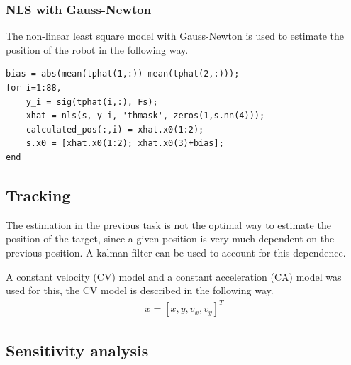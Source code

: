 \documentclass[11pt]{article}
\begin{document}
\subsubsection{NLS with Gauss-Newton}
The non-linear least square model with Gauss-Newton is used to estimate the position of the robot in the following way.

\begin{verbatim}
bias = abs(mean(tphat(1,:))-mean(tphat(2,:)));
for i=1:88,
    y_i = sig(tphat(i,:), Fs);
    xhat = nls(s, y_i, 'thmask', zeros(1,s.nn(4)));
    calculated_pos(:,i) = xhat.x0(1:2);
    s.x0 = [xhat.x0(1:2); xhat.x0(3)+bias];
end
\end{verbatim}


\subsection{Tracking}
The estimation in the previous task is not the optimal way to estimate the position of the target, since a given position is very much dependent on the previous position. A kalman filter can be used to account for this dependence.

A constant velocity (CV) model and a constant acceleration (CA) model was used for this, the CV model is described in the following way.
\begin{align*}
x = [x, y, v_x, v_y]^T
\end{align*}


\subsection{Sensitivity analysis}
\end{document}

